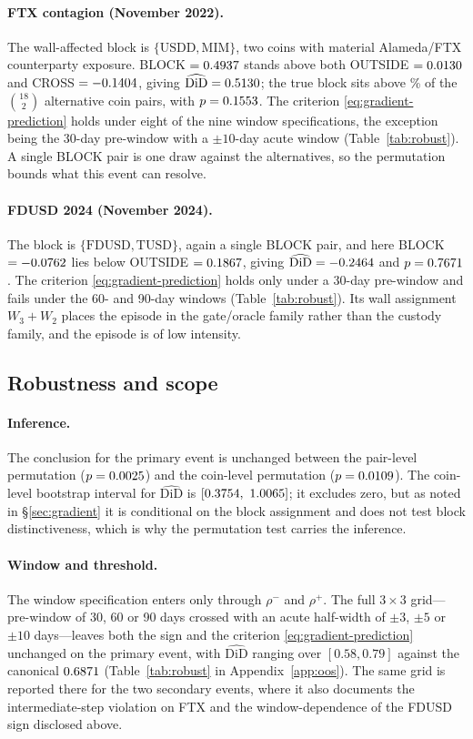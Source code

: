 \paragraph{FTX contagion (November 2022).} The wall-affected block is $\{\text{USDD},\text{MIM}\}$, two coins with material Alameda/FTX counterparty exposure. BLOCK $= 0.4937$ stands above both OUTSIDE $= 0.0130$ and CROSS $= -0.1404$, giving $\widehat{\mathrm{DiD}} = 0.5130$; the true block sits above \GFTXPCT\% of the $\binom{18}{2}$ alternative coin pairs, with $p = 0.1553$. The criterion \eqref{eq:gradient-prediction} holds under eight of the nine window specifications, the exception being the 30-day pre-window with a $\pm10$-day acute window (Table~\ref{tab:robust}). A single BLOCK pair is one draw against the alternatives, so the permutation bounds what this event can resolve.

\paragraph{FDUSD 2024 (November 2024).} The block is $\{\text{FDUSD},\text{TUSD}\}$, again a single BLOCK pair, and here BLOCK $= -0.0762$ lies below OUTSIDE $= 0.1867$, giving $\widehat{\mathrm{DiD}} = -0.2464$ and $p = 0.7671$. The criterion \eqref{eq:gradient-prediction} holds only under a 30-day pre-window and fails under the 60- and 90-day windows (Table~\ref{tab:robust}). Its wall assignment $W_3+W_2$ places the episode in the gate/oracle family rather than the custody family, and the episode is of low intensity.

\subsection{Robustness and scope}\label{sec:robust}
\paragraph{Inference.} The conclusion for the primary event is unchanged between the pair-level permutation ($p = 0.0025$) and the coin-level permutation ($p = 0.0109$). The coin-level bootstrap interval for $\widehat{\mathrm{DiD}}$ is $[0.3754,\ 1.0065]$; it excludes zero, but as noted in \S\ref{sec:gradient} it is conditional on the block assignment and does not test block distinctiveness, which is why the permutation test carries the inference.

\paragraph{Window and threshold.} The window specification enters only through $\rho^-$ and $\rho^+$. The full $3 \times 3$ grid---pre-window of 30, 60 or 90 days crossed with an acute half-width of $\pm3$, $\pm5$ or $\pm10$ days---leaves both the sign and the criterion \eqref{eq:gradient-prediction} unchanged on the primary event, with $\widehat{\mathrm{DiD}}$ ranging over $[0.58, 0.79]$ against the canonical $0.6871$ (Table~\ref{tab:robust} in Appendix~\ref{app:oos}). The same grid is reported there for the two secondary events, where it also documents the intermediate-step violation on FTX and the window-dependence of the FDUSD sign disclosed above.

